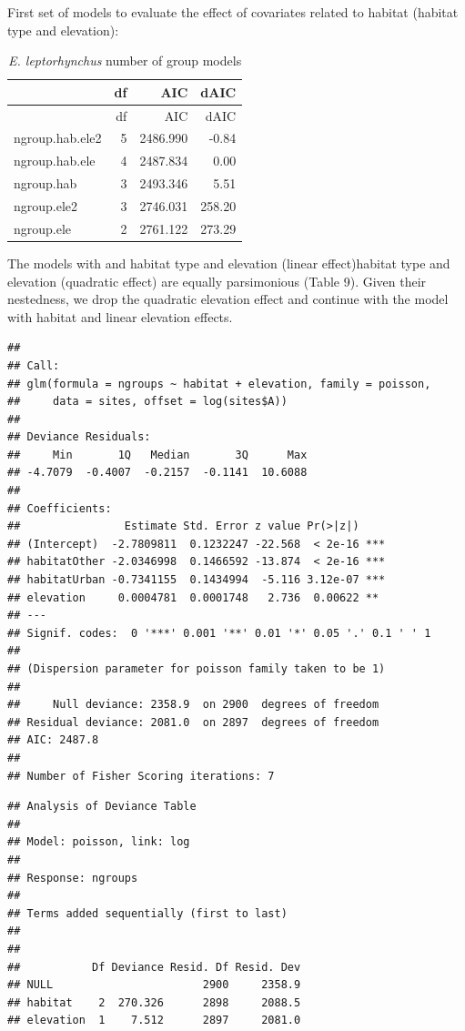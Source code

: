 \documentclass[]{article}
\begin{document}
First set of models to evaluate the effect of covariates related to
habitat (habitat type and elevation):

\begin{longtable}[]{@{}lrrr@{}}
\caption{\textit{E. leptorhynchus} number of group
models}\tabularnewline
\toprule
& df & AIC & dAIC\tabularnewline
\midrule
\endfirsthead
\toprule
& df & AIC & dAIC\tabularnewline
\midrule
\endhead
ngroup.hab.ele2 & 5 & 2486.990 & -0.84\tabularnewline
ngroup.hab.ele & 4 & 2487.834 & 0.00\tabularnewline
ngroup.hab & 3 & 2493.346 & 5.51\tabularnewline
ngroup.ele2 & 3 & 2746.031 & 258.20\tabularnewline
ngroup.ele & 2 & 2761.122 & 273.29\tabularnewline
\bottomrule
\end{longtable}

The models with and habitat type and elevation (linear effect)habitat
type and elevation (quadratic effect) are equally parsimonious (Table
9). Given their nestedness, we drop the quadratic elevation effect and
continue with the model with habitat and linear elevation effects.

\begin{verbatim}
## 
## Call:
## glm(formula = ngroups ~ habitat + elevation, family = poisson, 
##     data = sites, offset = log(sites$A))
## 
## Deviance Residuals: 
##     Min       1Q   Median       3Q      Max  
## -4.7079  -0.4007  -0.2157  -0.1141  10.6088  
## 
## Coefficients:
##                Estimate Std. Error z value Pr(>|z|)    
## (Intercept)  -2.7809811  0.1232247 -22.568  < 2e-16 ***
## habitatOther -2.0346998  0.1466592 -13.874  < 2e-16 ***
## habitatUrban -0.7341155  0.1434994  -5.116 3.12e-07 ***
## elevation     0.0004781  0.0001748   2.736  0.00622 ** 
## ---
## Signif. codes:  0 '***' 0.001 '**' 0.01 '*' 0.05 '.' 0.1 ' ' 1
## 
## (Dispersion parameter for poisson family taken to be 1)
## 
##     Null deviance: 2358.9  on 2900  degrees of freedom
## Residual deviance: 2081.0  on 2897  degrees of freedom
## AIC: 2487.8
## 
## Number of Fisher Scoring iterations: 7
\end{verbatim}

\begin{verbatim}
## Analysis of Deviance Table
## 
## Model: poisson, link: log
## 
## Response: ngroups
## 
## Terms added sequentially (first to last)
## 
## 
##           Df Deviance Resid. Df Resid. Dev
## NULL                       2900     2358.9
## habitat    2  270.326      2898     2088.5
## elevation  1    7.512      2897     2081.0
\end{verbatim}
\end{document}
